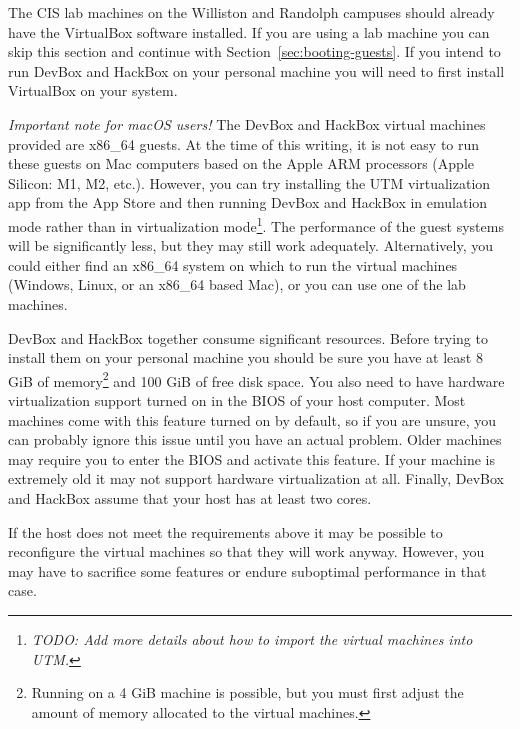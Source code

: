 \documentclass[twocolumn]{article}
\newcommand{\todo}[1]{\textit{TODO: #1}}
\begin{document}
The CIS lab machines on the Williston and Randolph campuses should already have the VirtualBox
software installed. If you are using a lab machine you can skip this section and continue with
Section~\ref{sec:booting-guests}. If you intend to run DevBox and HackBox on your personal
machine you will need to first install VirtualBox on your system.

\textit{Important note for macOS users!} The DevBox and HackBox virtual machines provided are
x86\_64 guests. At the time of this writing, it is not easy to run these guests on Mac computers
based on the Apple ARM processors (Apple Silicon: M1, M2, etc.). However, you can try installing
the UTM virtualization app from the App Store and then running DevBox and HackBox in emulation
mode rather than in virtualization mode\footnote{\todo{Add more details about how to import the
virtual machines into UTM.}}. The performance of the guest systems will be significantly less,
but they may still work adequately. Alternatively, you could either find an x86\_64 system on
which to run the virtual machines (Windows, Linux, or an x86\_64 based Mac), or you can use one
of the lab machines.

DevBox and HackBox together consume significant resources. Before trying to install them on your
personal machine you should be sure you have at least 8 GiB of memory\footnote{Running on a 4
GiB machine is possible, but you must first adjust the amount of memory allocated to the virtual
machines.} and 100 GiB of free disk space. You also need to have hardware virtualization support
turned on in the BIOS of your host computer. Most machines come with this feature turned on by
default, so if you are unsure, you can probably ignore this issue until you have an actual
problem. Older machines may require you to enter the BIOS and activate this feature. If your
machine is extremely old it may not support hardware virtualization at all. Finally, DevBox and
HackBox assume that your host has at least two cores.

If the host does not meet the requirements above it may be possible to reconfigure the virtual
machines so that they will work anyway. However, you may have to sacrifice some features or
endure suboptimal performance in that case.
\end{document}
